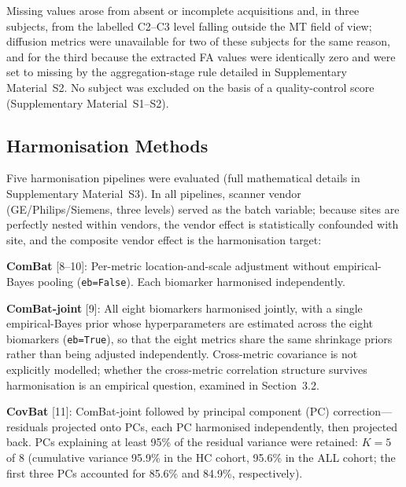 \documentclass[12pt,a4paper]{article}
\begin{document}
Missing values arose from absent or incomplete acquisitions and, in three subjects, from the labelled C2--C3 level falling outside the MT field of view; diffusion metrics were unavailable for two of these subjects for the same reason, and for the third because the extracted FA values were identically zero and were set to missing by the aggregation-stage rule detailed in Supplementary Material~S2. No subject was excluded on the basis of a quality-control score (Supplementary Material~S1--S2).

\subsection{Harmonisation Methods}

Five harmonisation pipelines were evaluated (full mathematical details in Supplementary Material~S3). In all pipelines, scanner vendor (GE/Philips/Siemens, three levels) served as the batch variable; because sites are perfectly nested within vendors, the vendor effect is statistically confounded with site, and the composite vendor effect is the harmonisation target:

\textbf{ComBat} [8--10]: Per-metric location-and-scale adjustment without empirical-Bayes pooling (\texttt{eb=False}). Each biomarker harmonised independently.

\textbf{ComBat-joint} [9]: All eight biomarkers harmonised jointly, with a single empirical-Bayes prior whose hyperparameters are estimated across the eight biomarkers (\texttt{eb=True}), so that the eight metrics share the same shrinkage priors rather than being adjusted independently. Cross-metric covariance is not explicitly modelled; whether the cross-metric correlation structure survives harmonisation is an empirical question, examined in Section~3.2.

\textbf{CovBat} [11]: ComBat-joint followed by principal component (PC) correction---residuals projected onto PCs, each PC harmonised independently, then projected back. PCs explaining at least 95\% of the residual variance were retained: $K=5$ of 8 (cumulative variance 95.9\% in the HC cohort, 95.6\% in the ALL cohort; the first three PCs accounted for 85.6\% and 84.9\%, respectively).
\end{document}
